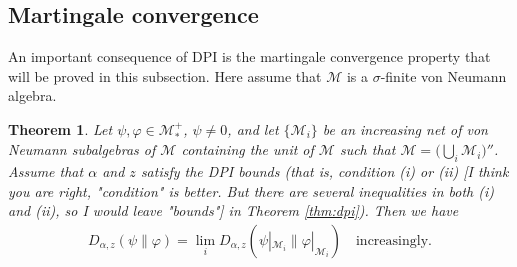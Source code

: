 \documentclass[12pt]{article}
\newtheorem{theorem}{Theorem}[section]
\theoremstyle{definition}
\theoremstyle{remark}
\numberwithin{equation}{section}
\def\cM{\mathcal M}
\def\Me{\mathcal M}
\def\ffi{\varphi}
\begin{document}
\subsection{Martingale convergence}

An important consequence of DPI is the martingale convergence property that will be
proved in this {subsection. Here assume that $\cM$ is a $\sigma$-finite von Neumann algebra.}

\begin{theorem}\label{thm:martingale}
Let $\psi,\varphi\in \Me_*^+$, $\psi\ne 0$, and let $\{\cM_i\}$ be an increasing net of von Neumann
subalgebras of $\cM$ containing the unit of $\cM$ such that $\cM=\bigl(\bigcup_i\cM_i\bigr)''$.
Assume that $\alpha$ and $z$ satisfy the DPI bounds (that is, condition (i) or (ii)
{\color{orange}[I think you are right, "condition" is better. But there are several inequalities in both
(i) and (ii), so I would leave "bounds"]}
in Theorem \ref{thm:dpi}). Then we have
\begin{align}\label{eq:martingale}
D_{\alpha,z}(\psi\|\ffi)=\lim_iD_{\alpha,z}(\psi|_{\cM_i}\|\ffi|_{\cM_i})
\quad\mbox{increasingly}.
\end{align}
\end{theorem}
\end{document}
